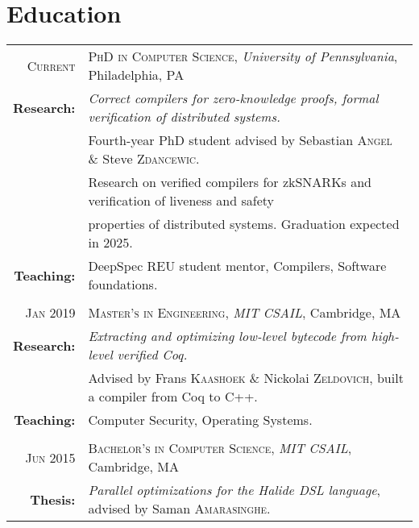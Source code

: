 \documentclass[lettersize,11pt]{article}
\begin{document}
\section{Education}
\begin{tabular}{rl}
\textsc{Current} & \textsc{PhD in Computer Science}, \emph{University of Pennsylvania}, Philadelphia, PA\\
\textbf{Research:} & \emph{Correct compilers for zero-knowledge proofs, formal verification of distributed systems.}\\
& Fourth-year PhD student advised by Sebastian \textsc{Angel} \& Steve \textsc{Zdancewic}. \\
& Research on verified compilers for zkSNARKs and verification of liveness and safety \\
& properties of distributed systems. Graduation expected in 2025. \\
\textbf{Teaching:} & DeepSpec REU student mentor, Compilers, Software foundations. \\
 & \\[-0.5em]
\textsc{Jan} 2019 & \textsc{Master's in Engineering}, \emph{MIT} \emph{CSAIL}, Cambridge, MA\\
\textbf{Research:} & \emph{Extracting and optimizing low-level bytecode from high-level verified Coq.}\\
& Advised by Frans \textsc{Kaashoek} \& Nickolai \textsc{Zeldovich}, built a compiler from Coq to C++. \\
\textbf{Teaching:} & Computer Security, Operating Systems. \\
 & \\[-0.5em]
\textsc{Jun} 2015 & \textsc{Bachelor's in Computer Science}, \emph{MIT} \emph{CSAIL}, Cambridge, MA\\
\textbf{Thesis:} & \emph{Parallel optimizations for the Halide DSL language}, advised by Saman \textsc{Amarasinghe}. \\
\end{tabular}
\end{document}
